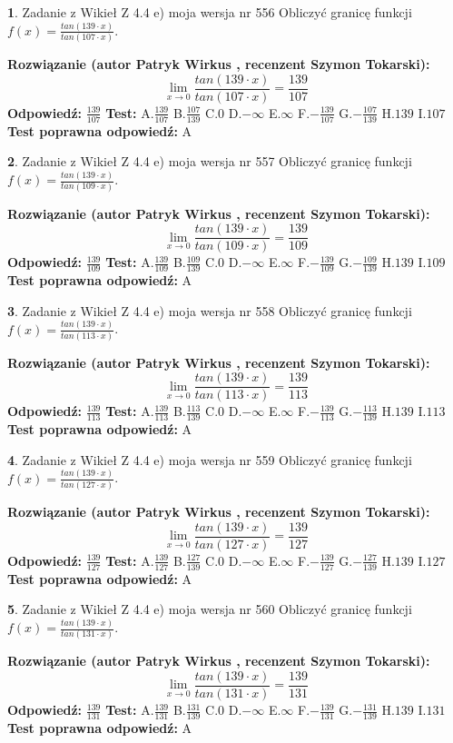 \documentclass[12pt, a4paper]{article}
\theoremstyle{definition} %
\newtheorem{zad}{}
\newcommand{\zadStart}[1]{\begin{zad}#1\newline}
\newcommand{\zadStop}{\end{zad}}
\newcommand{\rozwStart}[2]{\noindent \textbf{Rozwiązanie (autor #1 , recenzent #2): }\newline}
\newcommand{\rozwStop}{\newline}
\newcommand{\odpStart}{\noindent \textbf{Odpowiedź:}\newline}
\newcommand{\odpStop}{\newline}
\newcommand{\testStart}{\noindent \textbf{Test:}\newline}
\newcommand{\testStop}{\newline}
\newcommand{\kluczStart}{\noindent \textbf{Test poprawna odpowiedź:}\newline}
\newcommand{\kluczStop}{\newline}
\begin{document}
\zadStart{Zadanie z Wikieł Z 4.4 e) moja wersja nr 556}
Obliczyć granicę funkcji $f(x)=\frac{tan(139\cdot x)}{tan(107\cdot x)}$.
\zadStop
\rozwStart{Patryk Wirkus}{Szymon Tokarski}
$$\lim\limits_{x\to 0}\frac{tan(139\cdot x)}{tan(107\cdot x)}=
\frac{139}{107}$$
\rozwStop
\odpStart
$\frac{139}{107}$
\odpStop
\testStart
A.$\frac{139}{107}$
B.$\frac{107}{139}$
C.$0$
D.$-\infty$
E.$\infty$
F.$-\frac{139}{107}$
G.$-\frac{107}{139}$
H.$139$
I.$107$
\testStop
\kluczStart
A
\kluczStop



\zadStart{Zadanie z Wikieł Z 4.4 e) moja wersja nr 557}
Obliczyć granicę funkcji $f(x)=\frac{tan(139\cdot x)}{tan(109\cdot x)}$.
\zadStop
\rozwStart{Patryk Wirkus}{Szymon Tokarski}
$$\lim\limits_{x\to 0}\frac{tan(139\cdot x)}{tan(109\cdot x)}=
\frac{139}{109}$$
\rozwStop
\odpStart
$\frac{139}{109}$
\odpStop
\testStart
A.$\frac{139}{109}$
B.$\frac{109}{139}$
C.$0$
D.$-\infty$
E.$\infty$
F.$-\frac{139}{109}$
G.$-\frac{109}{139}$
H.$139$
I.$109$
\testStop
\kluczStart
A
\kluczStop



\zadStart{Zadanie z Wikieł Z 4.4 e) moja wersja nr 558}
Obliczyć granicę funkcji $f(x)=\frac{tan(139\cdot x)}{tan(113\cdot x)}$.
\zadStop
\rozwStart{Patryk Wirkus}{Szymon Tokarski}
$$\lim\limits_{x\to 0}\frac{tan(139\cdot x)}{tan(113\cdot x)}=
\frac{139}{113}$$
\rozwStop
\odpStart
$\frac{139}{113}$
\odpStop
\testStart
A.$\frac{139}{113}$
B.$\frac{113}{139}$
C.$0$
D.$-\infty$
E.$\infty$
F.$-\frac{139}{113}$
G.$-\frac{113}{139}$
H.$139$
I.$113$
\testStop
\kluczStart
A
\kluczStop



\zadStart{Zadanie z Wikieł Z 4.4 e) moja wersja nr 559}
Obliczyć granicę funkcji $f(x)=\frac{tan(139\cdot x)}{tan(127\cdot x)}$.
\zadStop
\rozwStart{Patryk Wirkus}{Szymon Tokarski}
$$\lim\limits_{x\to 0}\frac{tan(139\cdot x)}{tan(127\cdot x)}=
\frac{139}{127}$$
\rozwStop
\odpStart
$\frac{139}{127}$
\odpStop
\testStart
A.$\frac{139}{127}$
B.$\frac{127}{139}$
C.$0$
D.$-\infty$
E.$\infty$
F.$-\frac{139}{127}$
G.$-\frac{127}{139}$
H.$139$
I.$127$
\testStop
\kluczStart
A
\kluczStop



\zadStart{Zadanie z Wikieł Z 4.4 e) moja wersja nr 560}
Obliczyć granicę funkcji $f(x)=\frac{tan(139\cdot x)}{tan(131\cdot x)}$.
\zadStop
\rozwStart{Patryk Wirkus}{Szymon Tokarski}
$$\lim\limits_{x\to 0}\frac{tan(139\cdot x)}{tan(131\cdot x)}=
\frac{139}{131}$$
\rozwStop
\odpStart
$\frac{139}{131}$
\odpStop
\testStart
A.$\frac{139}{131}$
B.$\frac{131}{139}$
C.$0$
D.$-\infty$
E.$\infty$
F.$-\frac{139}{131}$
G.$-\frac{131}{139}$
H.$139$
I.$131$
\testStop
\kluczStart
A
\kluczStop
\end{document}
